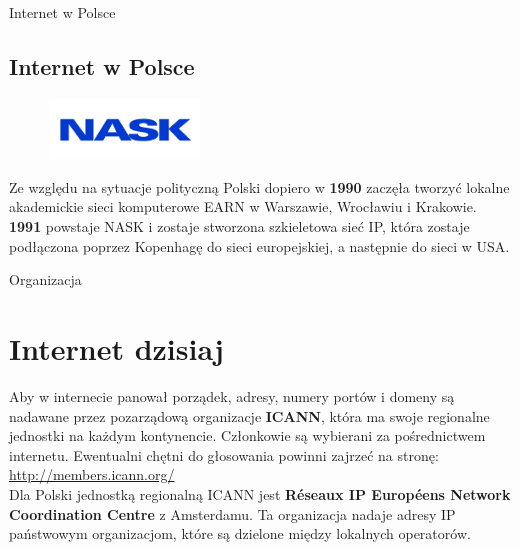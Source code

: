 \documentclass{beamer}
\begin{document}
	\begin{frame}{Internet w Polsce}
		\subsection{Internet w Polsce}
		\begin{figure}
			\flushleft
			\vspace{40pt}
			\includegraphics[width=4cm]{NASK.png}
		\end{figure}
		Ze względu na sytuacje polityczną Polski dopiero w \textbf{1990} zaczęła tworzyć lokalne akademickie sieci komputerowe EARN w Warszawie, Wrocławiu i Krakowie. \textbf{1991} powstaje NASK i zostaje stworzona szkieletowa sieć IP, która zostaje podłączona poprzez Kopenhagę do sieci europejskiej, a następnie do sieci w USA.
	\end{frame}
	\begin{frame}{Organizacja}
		\section{Internet dzisiaj}
		Aby w internecie panował porządek, adresy, numery portów i domeny są nadawane przez pozarządową organizacje \textbf{ICANN}, która ma swoje regionalne jednostki na każdym kontynencie. Członkowie są wybierani za pośrednictwem internetu. Ewentualni chętni do głosowania powinni zajrzeć na stronę: \url{http://members.icann.org/} \\ Dla Polski jednostką regionalną ICANN jest \textbf{Réseaux IP Européens Network Coordination Centre} z Amsterdamu. Ta organizacja nadaje adresy IP państwowym organizacjom, które są dzielone między lokalnych operatorów.
	\end{frame}
\end{document}

